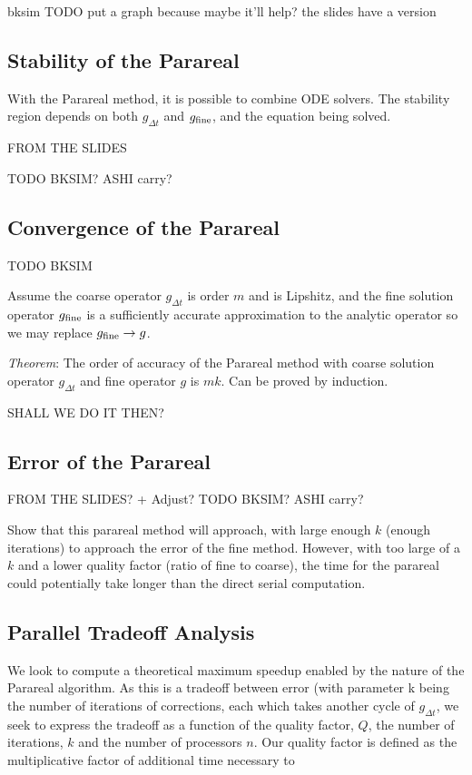 \documentclass[letterpaper,12pt]{article}
\begin{document}
bksim TODO put a graph because maybe it'll help? the slides have a version

\subsection{Stability of the Parareal}

With the Parareal method, it is possible to combine ODE solvers. The stability region depends on both $g_{\Delta t}$ and $g_{\textnormal{fine}}$, and the
equation being solved. 

FROM THE SLIDES 

TODO BKSIM? ASHI carry?

\subsection{Convergence of the Parareal}

TODO BKSIM

Assume the coarse operator $g_{\Delta t}$ is order $m$ and is Lipshitz, and the
fine solution operator $g_{\textnormal{fine}}$ is a sufficiently accurate
approximation to the analytic operator so we may replace $g_{\textnormal{fine}}
\to g$. 

\emph{Theorem}: The order of accuracy of the Parareal method with coarse
solution operator $g_{\Delta t}$ and fine operator $g$ is $mk$. Can be proved by
induction. 

SHALL WE DO IT THEN?

\subsection{Error of the Parareal}

FROM THE SLIDES? + Adjust?
TODO BKSIM? ASHI carry?

Show that this parareal method will approach, with large enough $k$ (enough
iterations) to approach the error of the fine method. However, with too large of
a $k$ and a lower quality factor (ratio of fine to coarse), the time for the
parareal could potentially take longer than the direct serial computation.

\subsection{Parallel Tradeoff Analysis}

We look to compute a theoretical maximum speedup enabled by the nature of the Parareal algorithm.  As this is a tradeoff between error (with parameter k being the number of iterations of corrections, each which takes another cycle of $g_{\Delta t}$, we seek to express the tradeoff as a function of the quality factor, $Q$, the number of iterations, $k$ and the number of processors $n$.  Our quality factor is defined as the multiplicative factor of additional time necessary to 
\end{document}
